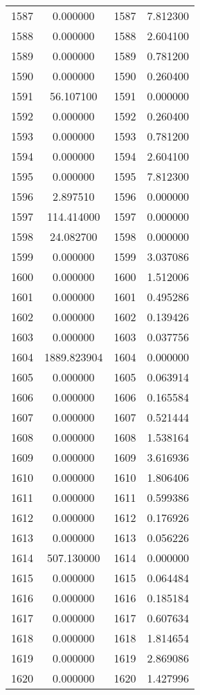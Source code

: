 \documentclass[12pt]{article}
\begin{document}
\begin{longtable}{@{}cccc@{}}
1587 & 0.000000 & 1587 & 7.812300 \\
1588 & 0.000000 & 1588 & 2.604100 \\
1589 & 0.000000 & 1589 & 0.781200 \\
1590 & 0.000000 & 1590 & 0.260400 \\
1591 & 56.107100 & 1591 & 0.000000 \\
1592 & 0.000000 & 1592 & 0.260400 \\
1593 & 0.000000 & 1593 & 0.781200 \\
1594 & 0.000000 & 1594 & 2.604100 \\
1595 & 0.000000 & 1595 & 7.812300 \\
1596 & 2.897510 & 1596 & 0.000000 \\
1597 & 114.414000 & 1597 & 0.000000 \\
1598 & 24.082700 & 1598 & 0.000000 \\
1599 & 0.000000 & 1599 & 3.037086 \\
1600 & 0.000000 & 1600 & 1.512006 \\
1601 & 0.000000 & 1601 & 0.495286 \\
1602 & 0.000000 & 1602 & 0.139426 \\
1603 & 0.000000 & 1603 & 0.037756 \\
1604 & 1889.823904 & 1604 & 0.000000 \\
1605 & 0.000000 & 1605 & 0.063914 \\
1606 & 0.000000 & 1606 & 0.165584 \\
1607 & 0.000000 & 1607 & 0.521444 \\
1608 & 0.000000 & 1608 & 1.538164 \\
1609 & 0.000000 & 1609 & 3.616936 \\
1610 & 0.000000 & 1610 & 1.806406 \\
1611 & 0.000000 & 1611 & 0.599386 \\
1612 & 0.000000 & 1612 & 0.176926 \\
1613 & 0.000000 & 1613 & 0.056226 \\
1614 & 507.130000 & 1614 & 0.000000 \\
1615 & 0.000000 & 1615 & 0.064484 \\
1616 & 0.000000 & 1616 & 0.185184 \\
1617 & 0.000000 & 1617 & 0.607634 \\
1618 & 0.000000 & 1618 & 1.814654 \\
1619 & 0.000000 & 1619 & 2.869086 \\
1620 & 0.000000 & 1620 & 1.427996 \\

\end{longtable}
\end{document}
